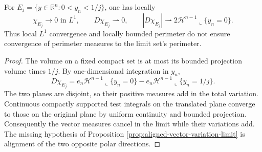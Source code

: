 \begin{example}\label{ex:collapsing-slab-perimeter}
For $E_j=\{y\in\mathbb R^n:0<y_n<1/j\}$, one has locally
\[
 \chi_{E_j}\to0\text{ in }L^1,\qquad
 D\chi_{E_j}\rightharpoonup0,\qquad
 |D\chi_{E_j}|\rightharpoonup2\mathcal H^{n-1}\llcorner\{y_n=0\}.
\]
Thus local $L^1$ convergence and locally bounded perimeter do not ensure convergence of perimeter measures to the limit set's perimeter.
\end{example}
\begin{proof}
The volume on a fixed compact set is at most its bounded projection volume times $1/j$. By one-dimensional integration in $y_n$,
\[
 D\chi_{E_j}=e_n\mathcal H^{n-1}\llcorner\{y_n=0\}
             -e_n\mathcal H^{n-1}\llcorner\{y_n=1/j\}.
\]
The two planes are disjoint, so their positive measures add in the total variation. Continuous compactly supported test integrals on the translated plane converge to those on the original plane by uniform continuity and bounded projection. Consequently the vector measures cancel in the limit while their variations add. The missing hypothesis of Proposition \ref{prop:aligned-vector-variation-limit} is alignment of the two opposite polar directions.
\end{proof}

